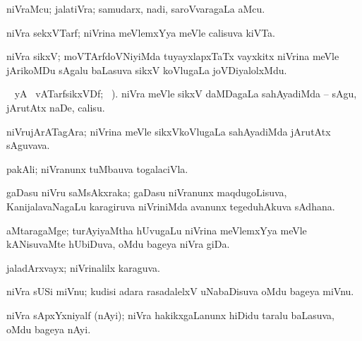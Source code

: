 \bentry
{} 
\gl{\nA}
\expl{}
\bmng
niVraMcu; jalatiVra; samudarx, nadi, saroVvaragaLa aMcu. 
\emng
\eentry

\bentry
{} 
\gl{\nA}
\expl{}
\bmng
niVra sekxVTarf; niVrina meVlemxYya meVle calisuva kiVTa. 
\emng
\eentry

\bentry
{} 
\gl{\nA}
\bmng
niVra sikxV; moVTArfdoVNiyiMda tuyayxlapxTaTx vayxkitx niVrina meVle jArikoMDu sAgalu baLasuva sikxV koVlugaLa joVDiyalolxMdu. 
\emng
\eentry

\bentry
{} 
\gl{\akirx}
 \BUkaq\  yA  \ucAcx\ vATarfsikxVDf; \vakaq\ ).\bmng
niVra meVle sikxV daMDagaLa sahAyadiMda -- sAgu, jArutAtx naDe, calisu. 
\emng
\eentry

\bentry
{} 
\gl{\nA}
\expl{}
\bmng
niVrujArATagAra; niVrina meVle sikxVkoVlugaLa sahAyadiMda jArutAtx sAguvava. 
\emng
\eentry

\bentry
{} 
\gl{\nA}
\expl{}
\bmng
pakAli; niVranunx tuMbauva togalaciVla. 
\emng
\eentry

\bentry
{} 
\gl{\nA}
\expl{}
\bmng
gaDasu niVru saMsAkxraka; gaDasu niVranunx maqdugoLisuva, KanijalavaNagaLu karagiruva niVriniMda avanunx tegeduhAkuva sAdhana. 
\emng
\eentry

\bentry
{} 
\gl{\nA}
\expl{}
\bmng
aMtaragaMge; turAyiyaMtha hUvugaLu niVrina meVlemxYya meVle kANisuvaMte hUbiDuva, oMdu bageya niVra giDa. 
\emng
\eentry

\bentry
{} 
\gl{\gu}
\expl{}
\bmng
jaladArxvayx; niVrinalilx karaguva. 
\emng
\eentry

\bentry
{} 
\gl{\nA}
\expl{}
\bmng
niVra sUSi miVnu; kudisi adara rasadalelxV uNabaDisuva oMdu bageya miVnu. 
\emng
\eentry

\bentry
{} 
\gl{\nA}
\expl{}
\bmng
niVra sApxYxniyalf (nAyi); niVra hakikxgaLanunx hiDidu taralu baLasuva, oMdu bageya nAyi.  
\emng
\eentry

